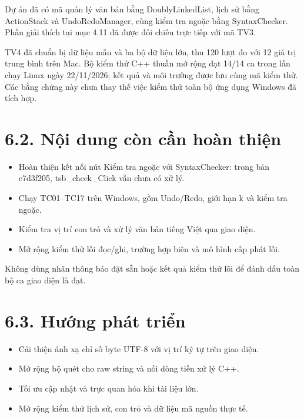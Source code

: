 Dự án đã có mã quản lý văn bản bằng DoublyLinkedList, lịch sử bằng
ActionStack và UndoRedoManager, cùng kiểm tra ngoặc bằng SyntaxChecker.
Phần giải thích tại mục 4.11 đã được đối chiếu trực tiếp với mã TV3.

TV4 đã chuẩn bị dữ liệu mẫu và ba bộ dữ liệu lớn, thu 120 lượt đo với 12
giá trị trung bình trên Mac. Bộ kiểm thử C++ thuần mở rộng đạt 14/14 ca
trong lần chạy Linux ngày 22/11/2026; kết quả và môi trường được lưu
cùng mã kiểm thử. Các bằng chứng này chưa thay thế việc kiểm thử toàn bộ
ứng dụng Windows đã tích hợp.


\section{6.2. Nội dung còn cần hoàn
thiện}\label{tv4-22-6-2-nux1ed9i-dung-cuxf2n-cux1ea7n-houxe0n-thiux1ec7n}

\begin{itemize}
\tightlist
\item
  Hoàn thiện kết nối nút Kiểm tra ngoặc với SyntaxChecker: trong bản
  c7d3f205, tsb\_check\_Click vẫn chưa có xử lý.
\item
  Chạy TC01--TC17 trên Windows, gồm Undo/Redo, giới hạn k và kiểm tra
  ngoặc.
\item
  Kiểm tra vị trí con trỏ và xử lý văn bản tiếng Việt qua giao diện.
\item
  Mở rộng kiểm thử lỗi đọc/ghi, trường hợp biên và mô hình cấp phát lỗi.
\end{itemize}

Không dùng nhãn thông báo đặt sẵn hoặc kết quả kiểm thử lõi để đánh dấu
toàn bộ ca giao diện là đạt.


\section{6.3. Hướng phát triển}\label{tv4-22-6-3-hux1b0ux1edbng-phuxe1t-triux1ec3n}

\begin{itemize}
\tightlist
\item
  Cải thiện ánh xạ chỉ số byte UTF-8 với vị trí ký tự trên giao diện.
\item
  Mở rộng bộ quét cho raw string và nối dòng tiền xử lý C++.
\item
  Tối ưu cập nhật và trực quan hóa khi tài liệu lớn.
\item
  Mở rộng kiểm thử lịch sử, con trỏ và dữ liệu mã nguồn thực tế.
\end{itemize}
